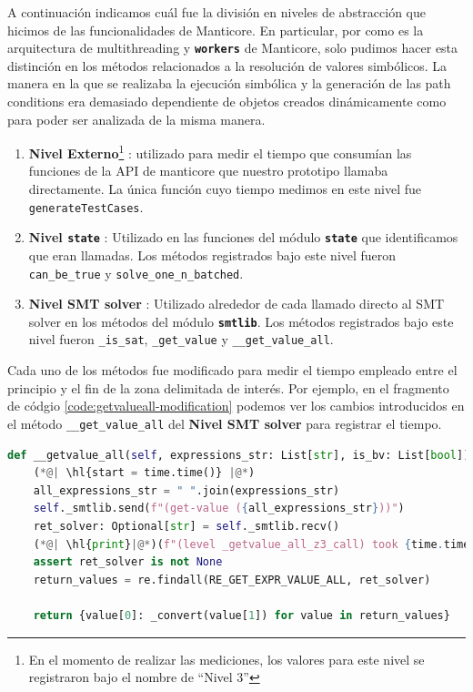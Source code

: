 A continuación indicamos cuál fue la división en niveles de abstracción que hicimos de las funcionalidades de Manticore.
En particular, por como es la arquitectura de multithreading y \textbf{\texttt{workers}} de Manticore, solo pudimos hacer esta distinción en los métodos relacionados a la resolución de valores simbólicos.
La manera en la que se realizaba la ejecución simbólica y la generación de las path conditions era demasiado dependiente de objetos creados dinámicamente como para poder ser analizada de la misma manera.
\begin{enumerate}
    \item \textbf{Nivel Externo}\footnote{En el momento de realizar las mediciones, los valores para este nivel se registraron bajo el nombre de  ``Nivel 3''} : utilizado para medir el tiempo que consumían las funciones de la API de manticore que nuestro prototipo llamaba directamente.
          La única función cuyo tiempo medimos en este nivel fue \texttt{generateTestCases}.
    \item \textbf{Nivel \texttt{state}} : Utilizado en las funciones del módulo \textbf{\texttt{state}} que identificamos que eran llamadas.
          Los métodos registrados bajo este nivel fueron \texttt{can\_be\_true} y \texttt{solve\_\allowbreak one\_\allowbreak n\_\allowbreak batched}.
    \item \textbf{Nivel SMT solver} : Utilizado alrededor de cada llamado directo al SMT solver en los métodos del módulo \textbf{\texttt{smtlib}}.
          Los métodos registrados bajo este nivel fueron \texttt{\_is\_sat}, \texttt{\_get\_value} y \texttt{\_\_get\_value\_all}.
\end{enumerate}
Cada uno de los métodos fue modificado para medir el tiempo empleado entre el principio y el fin de la zona delimitada de interés.
Por ejemplo, en el fragmento de códgio \ref{code:getvalueall-modification} podemos ver los cambios introducidos en el método \texttt{\_\_get\_value\_all} del \textbf{Nivel SMT solver} para registrar el tiempo.

\begin{lstlisting}[language=Python,
    label={code:getvalueall-modification},
    caption={Método \texttt{\_\_get\_value\_all} del modulo \textbf{\texttt{smtlib}} modificado para registrar el tiempo empleado por la llamada al SMT solver.
    El código resaltado indica las líneas agregadas para registrar el tiempo.},
    captionpos=b]
def __getvalue_all(self, expressions_str: List[str], is_bv: List[bool]) -> Dict[str, int]:
    (*@| \hl{start = time.time()} |@*)
    all_expressions_str = " ".join(expressions_str)
    self._smtlib.send(f"(get-value ({all_expressions_str}))")
    ret_solver: Optional[str] = self._smtlib.recv()
    (*@| \hl{print}|@*)(f"(level _getvalue_all_z3_call) took {time.time()- start} seconds")
    assert ret_solver is not None
    return_values = re.findall(RE_GET_EXPR_VALUE_ALL, ret_solver)
    
    return {value[0]: _convert(value[1]) for value in return_values}
\end{lstlisting}

